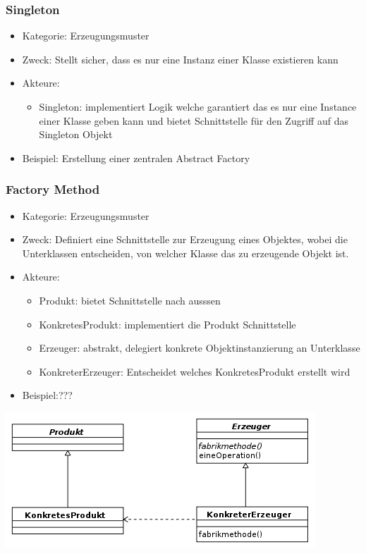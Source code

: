 \documentclass[11pt, fleqn, a4paper, leqno]{scrartcl} %
\begin{document}
		\subsubsection{Singleton}
			\begin{itemize}
				\item Kategorie: Erzeugungsmuster
				\item Zweck: Stellt sicher, dass es nur eine Instanz einer Klasse existieren kann
				\item Akteure: 
					\begin{itemize}
						\item Singleton: implementiert Logik welche garantiert das es nur eine Instance einer Klasse geben kann und bietet Schnittstelle für den Zugriff auf das Singleton Objekt
					\end{itemize}
				\item Beispiel: Erstellung einer zentralen Abstract Factory
			\end{itemize}
		\newpage
		\subsubsection{Factory Method}
			\begin{itemize}
				\item Kategorie: Erzeugungsmuster
				\item Zweck: Definiert eine Schnittstelle zur Erzeugung eines Objektes, wobei die Unterklassen entscheiden, von welcher Klasse das zu erzeugende Objekt ist.
				\item Akteure: 
					\begin{itemize}
						\item Produkt: bietet Schnittstelle nach ausssen
						\item KonkretesProdukt: implementiert die Produkt Schnittstelle
						\item Erzeuger: abstrakt, delegiert konkrete Objektinstanzierung an  Unterklasse
						\item KonkreterErzeuger: Entscheidet welches KonkretesProdukt erstellt wird
					\end{itemize}
				\item Beispiel:???
			\end{itemize}
			\includegraphics{images/factory-method.png}
		\newpage
		
\end{document}
